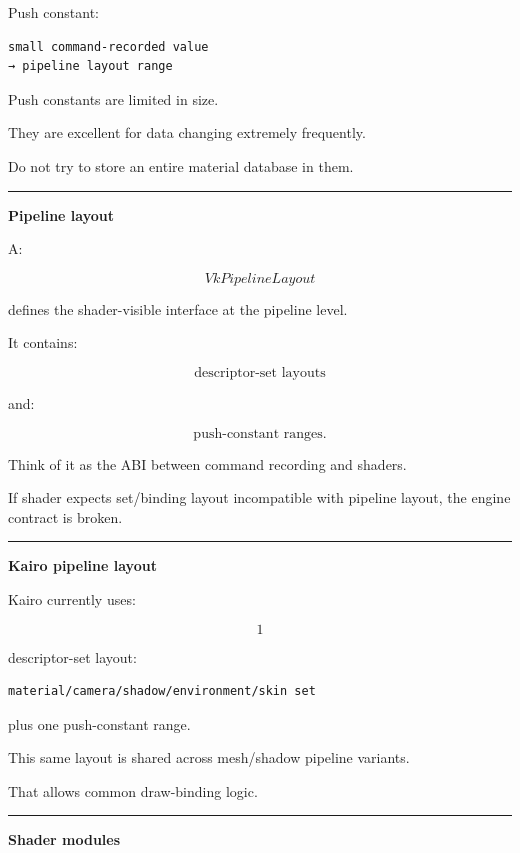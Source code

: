 Push constant:

\begin{verbatim}
small command-recorded value
→ pipeline layout range
\end{verbatim}

Push constants are limited in size.

They are excellent for data changing extremely frequently.

Do not try to store an entire material database in them.

\begin{center}\rule{0.5\linewidth}{0.5pt}\end{center}

\textbf{Pipeline layout}

A:

\[
VkPipelineLayout
\]

defines the shader-visible interface at the pipeline level.

It contains:

\[
\text{descriptor-set layouts}
\]

and:

\[
\text{push-constant ranges}.
\]

Think of it as the ABI between command recording and shaders.

If shader expects set/binding layout incompatible with pipeline layout, the engine contract is broken.

\begin{center}\rule{0.5\linewidth}{0.5pt}\end{center}

\textbf{Kairo pipeline layout}

Kairo currently uses:

\[
1
\]

descriptor-set layout:

\begin{verbatim}
material/camera/shadow/environment/skin set
\end{verbatim}

plus one push-constant range.

This same layout is shared across mesh/shadow pipeline variants.

That allows common draw-binding logic.

\begin{center}\rule{0.5\linewidth}{0.5pt}\end{center}

\textbf{Shader modules}

